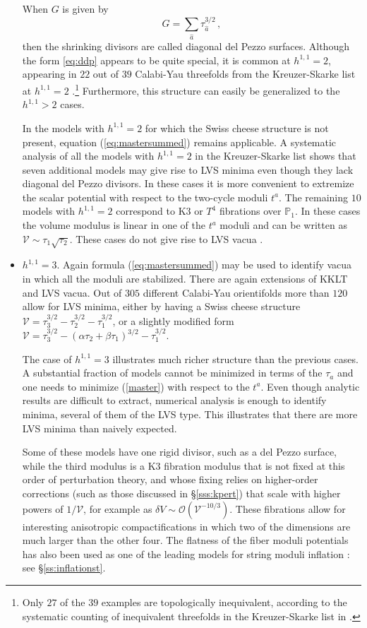 \documentclass[12pt,a4wide]{article}
\def\O{\mathcal{O}}
\def\V{\mathcal{V}}
\begin{document}
\begin{itemize}
When $G$ is given by
\begin{equation}\label{eq:ddp}
    G=\sum_{\hat a} \tau_{\hat a}^{3/2}\,,
\end{equation} then the shrinking divisors are called diagonal del Pezzo surfaces. 
Although the form \eqref{eq:ddp} appears to be quite special, it is common at   $h^{1,1}=2$, appearing in $22$ out of $39$  Calabi-Yau threefolds from the Kreuzer-Skarke list at $h^{1,1}=2$ \cite{AbdusSalam:2020ywo}.\footnote{Only $27$ of the $39$ examples are topologically inequivalent, according to the systematic counting of inequivalent threefolds in the Kreuzer-Skarke list in \cite{Chandra:2023afu,Gendler:2023ujl}.} 
Furthermore, this structure  can easily be generalized to the $h^{1,1}>2$ cases.

In the models with $h^{1,1}=2$ for which the Swiss cheese structure is not present, equation (\ref{eq:mastersummed}) remains applicable. 
A systematic analysis of all the models with $h^{1,1}=2$  in the Kreuzer-Skarke list shows that seven additional models may give rise to LVS minima even though they lack diagonal del Pezzo divisors. 
In these cases it is more convenient to extremize the scalar potential with respect to the two-cycle moduli $t^a$. 
The remaining $10$ models with $h^{1,1}=2$ correspond to K3 or $T^4$ fibrations over $\mathbb{P}_1$. In these cases the volume modulus is linear in one of the $t^a$ moduli and can be written as $\V\sim \tau_1\sqrt{\tau_2}$. These cases do not give rise to LVS vacua . 
 

\item $h^{1,1}=3$. Again formula (\ref{eq:mastersummed}) may be used to identify vacua in which all the moduli are stabilized. There are again extensions of KKLT and LVS vacua. Out of $305$ different Calabi-Yau orientifolds more than $120$ allow for LVS minima, either by having a Swiss cheese structure $\V=\tau_3^{3/2}-\tau_2^{3/2} -\tau_1^{3/2}$, or a slightly modified form $\V=\tau_3^{3/2}-(\alpha \tau_2+\beta\tau_1)^{3/2} -\tau_1^{3/2}$. 

The case of $h^{1,1}=3$ illustrates much richer structure than the previous cases. A substantial fraction of models cannot be minimized in terms of the $\tau_a$ and one needs to minimize (\ref{master}) with respect to the $t^a$. Even though analytic results are difficult to extract, numerical analysis is enough to identify minima, several of them of the LVS type. This illustrates that there are more LVS minima than naively expected.

Some of these models have one rigid divisor, such as a del Pezzo surface,
while the third modulus is a K3 fibration modulus that is not fixed at this order of perturbation theory, and whose fixing relies on higher-order corrections (such as those discussed in \S\ref{sss:kpert}) that scale with higher powers of $1/\V$, for example as $\delta V\sim \O(\V^{-10/3})$. These fibrations allow for interesting anisotropic compactifications
\cite{Cicoli:2011yy} in which two of the dimensions are much larger than the other four. The flatness of the fiber moduli potentials has also been used as one of the leading models for string moduli inflation \cite{Cicoli:2008gp}: see \S\ref{ss:inflationst}.


\end{itemize}
\end{document}
